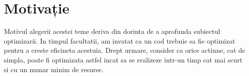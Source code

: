 \chapter*{Motivație} 

Motivul alegerii acestei teme deriva din dorinta de a aprofunda subiectul optimizarii. In timpul facultatii, am invatat ca un cod trebuie sa fie optimizat pentru a creste eficineta acestuia. Drept urmare, consider ca orice actiune, cat de simpla, poate fi optimizata astfel incat sa se realizeze intr-un timp cat mai scurt si cu un numar minim  de resurse.